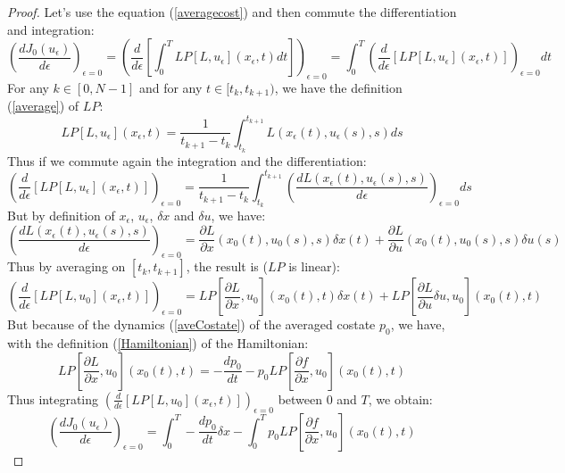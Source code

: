 \documentclass[a4paper,10pt]{article}
\begin{document}
\begin{proof}
    Let's use the equation (\ref{averagecost}) and then commute the 
    differentiation and integration:
\[
            \left(\frac{dJ_{0}(u_{\epsilon})}{d \epsilon}\right)_{\epsilon=0} 
        = \left( \frac{d}{d \epsilon}\left[ \int_{0}^{T} 
        LP[L,u_{\epsilon}](x_{\epsilon},t)dt \right] \right)_{\epsilon=0}
            =  \int_{0}^{T} \left(\frac{d}{d \epsilon}\left[  
        LP[L,u_{\epsilon}](x_{\epsilon},t)\right]\right)_{\epsilon=0}dt
\]
    For any $k \in [0,N-1]$ and for any $t \in [t_{k},t_{k+1})$, 
    we have the definition (\ref{average}) of $LP$:
    \[
      LP[L,u_{\epsilon}](x_{\epsilon},t)
    = \frac{1}{t_{k+1}-t_{k}}
    \int_{t_{k}}^{t_{k+1}}L(x_{\epsilon}(t),u_{\epsilon}(s),s)ds
    \]
    Thus if we commute again the integration and the differentiation:
 \[
            \left(\frac{d}{d \epsilon}\left[  
         LP[L,u_{\epsilon}](x_{\epsilon},t)\right]\right)_{\epsilon=0}
               = \frac{1}{t_{k+1}-t_{k}} 
                \int_{t_{k}}^{t_{k+1}} 
              \left(\frac{dL(x_{\epsilon}(t),u_{\epsilon}(s),s)}{d  \epsilon}\right)_{\epsilon=0} ds
 \]
      But by definition of $x_{\epsilon}$, $u_{\epsilon}$, $\delta x$ and $\delta u$, we have:
\[
            \left(\frac{dL(x_{\epsilon}(t),u_{\epsilon}(s),s)}{d \epsilon}\right)_{\epsilon=0} 
            =  \frac{\partial L}{\partial x}(x_{0}(t),u_{0}(s),s) \delta x(t) 
          + \frac{\partial L}{\partial u}(x_{0}(t),u_{0}(s),s) \delta u(s)
\]	  
     Thus by averaging on $[t_{k},t_{k+1}]$, the result is ($LP$ is 
     linear):
\[
        \left(\frac{d}{d \epsilon}\left[
        LP[L,u_{0}](x_{\epsilon},t)\right]\right)_{\epsilon=0}  
             =  LP\left[ \frac{\partial L}{\partial x},u_{0}\right](x_{0}(t),t) \delta x(t)  
               + LP\left[ \frac{\partial L}{\partial u} \delta u,u_{0}\right](x_{0}(t),t)  
\]
      But because of the dynamics (\ref{aveCostate}) of the averaged 
     costate $p_{0}$, we have, with the definition 
     (\ref{Hamiltonian}) of the Hamiltonian:
     \[
         LP\left[ \frac{\partial L}{\partial x},u_{0}\right](x_{0}(t),t)
	 = -\frac{dp_{0}}{dt} - p_{0} LP\left[ \frac{\partial f}{\partial x},u_{0}\right](x_{0}(t),t)
     \]
     Thus integrating $\left(\frac{d}{d \epsilon}\left[  
	LP[L,u_{0}](x_{\epsilon},t)\right]\right)_{\epsilon=0}$ 
     between $0$ and $T$, we obtain:
 \begin{equation}
           \left(\frac{dJ_{0}(u_{\epsilon})}{d \epsilon}\right)_{\epsilon=0}  =  
           \int_{0}^{T} -\frac{dp_{0}}{dt} \delta x 
            - \int_{0}^{T} p_{0} LP\left[ \frac{\partial f}{\partial x},u_{0}\right](x_{0}(t),t)

\end{equation}
\end{proof}
\end{document}
